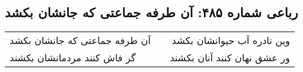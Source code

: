 \begin{center}
\section*{رباعی شماره ۴۸۵: آن طرفه جماعتی که جانشان بکشد}
\label{sec:0485}
\begin{longtable}{l p{0.5cm} r}
آن طرفه جماعتی که جانشان بکشد
&&
وین نادره آب حیوانشان بکشد
\\
گر فاش کنند مردمانشان بکشند
&&
ور عشق نهان کنند آنان بکشند
\\
\end{longtable}
\end{center}
